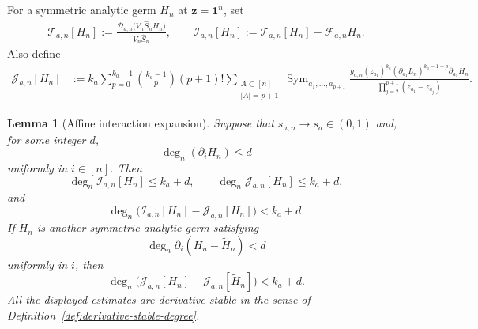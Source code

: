 \documentclass[11pt]{amsart}
\theoremstyle{plain}
\newtheorem{lemma}[theorem]{Lemma}
\numberwithin{equation}{section}
\numberwithin{theorem}{section}
\numberwithin{figure}{section}
\begin{document}
\begingroup

For a symmetric analytic germ \(H_n\) at \(\mathbf z=\mathbf1^n\), set
\begin{align}
    \mathscr T_{a,n}[H_n]
    :=
    \frac{
        \mathscr D_{a,n}
        \bigl(V_n\widehat S_n H_n\bigr)
    }{
        V_n\widehat S_n
    },
    \qquad
    \mathscr I_{a,n}[H_n]
    :=
    \mathscr T_{a,n}[H_n]-\mathcal F_{a,n}H_n.\label{dti}
\end{align}
Also define
\begin{align}
\mathscr J_{a,n}[H_n]
&:=
k_a\sum_{p=0}^{k_a-1}
\binom{k_a-1}{p}(p+1)!
\sum_{\substack{A\subset[n]\\ |A|=p+1}}
\operatorname{Sym}_{a_1,\ldots,a_{p+1}}
\frac{
    g_{a,n}(z_{a_1})^{k_a}
    (\partial_{a_1}L_n)^{k_a-1-p}
    \partial_{a_1}H_n
}{
    \prod_{j=2}^{p+1}(z_{a_1}-z_{a_j})
}.
\label{eq:affine-interaction-leading}
\end{align}

\begin{lemma}[Affine interaction expansion]
\label{lem:affine-interaction}
Suppose that \(s_{a,n}\to s_a\in(0,1)\) and, for some integer \(d\),
\[
    \deg_n(\partial_iH_n)\leq d
\]
uniformly in \(i\in[n]\). Then
\[
    \deg_n\mathscr I_{a,n}[H_n]\leq k_a+d,
    \qquad
    \deg_n\mathscr J_{a,n}[H_n]\leq k_a+d,
\]
and
\begin{equation}
    \deg_n\bigl(
        \mathscr I_{a,n}[H_n]
        -\mathscr J_{a,n}[H_n]
    \bigr)<k_a+d.
    \label{eq:affine-interaction-remainder}
\end{equation}
If \(\widetilde H_n\) is another symmetric analytic germ satisfying
\[
    \deg_n\partial_i(H_n-\widetilde H_n)<d
\]
uniformly in \(i\), then
\begin{equation}
    \deg_n\bigl(
        \mathscr J_{a,n}[H_n]
        -\mathscr J_{a,n}[\widetilde H_n]
    \bigr)<k_a+d.
    \label{eq:affine-interaction-replacement}
\end{equation}
All the displayed estimates are derivative-stable in the sense of
Definition~\ref{def:derivative-stable-degree}.
\end{lemma}
\end{document}
